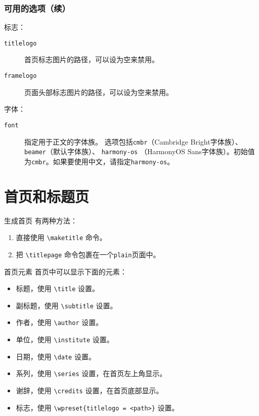\documentclass[no-math, aspectratio=1610, 10pt]{beamer}
\begin{document}
    \begin{frame}
        \frametitle{可用的选项（续）}

        标志：
        \begin{description}
            \item[\texttt{titlelogo}] 首页标志图片的路径，可以设为空来禁用。
            \item[\texttt{framelogo}] 页面头部标志图片的路径，可以设为空来禁用。
        \end{description}
    
        字体：
        \begin{description}
            \item[\texttt{font}] 指定用于正文的字体族。 选项包括\texttt{cmbr}（Cambridge Bright字体族）、 \texttt{beamer}（默认字体族）、 \texttt{harmony-os} （HarmonyOS Sans字体族）。初始值为\texttt{cmbr}。如果要使用中文，请指定\texttt{harmony-os}。
        \end{description}
    \end{frame}

    \section{首页和标题页}

    \begin{frame}[fragile]{生成首页}
        有两种方法：
        \begin{enumerate}
            \item 直接使用 \verb|\maketitle| 命令。
            \item 把 \verb|\titlepage| 命令包裹在一个\texttt{plain}页面中。
        \end{enumerate}
    \end{frame}

    \begin{frame}[fragile]{首页元素}
        首页中可以显示下面的元素：
        \begin{itemize}
            \item 标题，使用 \verb|\title| 设置。
            \item 副标题，使用 \verb|\subtitle| 设置。
            \item 作者，使用 \verb|\author| 设置。
            \item 单位，使用 \verb|\institute| 设置。
            \item 日期，使用 \verb|\date| 设置。
            \item 系列，使用 \verb|\series| 设置，在首页左上角显示。
            \item 谢辞，使用 \verb|\credits| 设置，在首页底部显示。
            \item 标志，使用 \verb|\wpreset{titlelogo = <path>}| 设置。
        \end{itemize}
    \end{frame}
\end{document}
